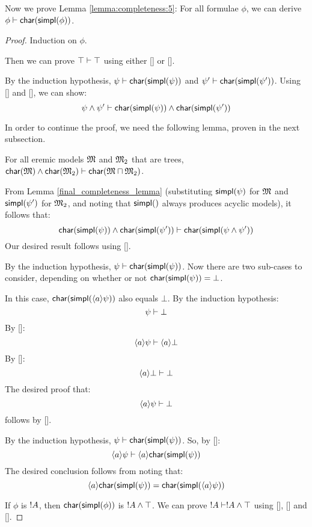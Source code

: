 Now we prove Lemma \ref{lemma:completeness:5}: 
For all formulae $\phi$, we can derive $\phi \vdash \mathsf{char}(\mathsf{simpl}(\phi))$.

\begin{proof}
Induction on $\phi$.


 Then we can prove $\top \vdash \top$ using
either [] or [].

 By the induction hypothesis,
$\psi \vdash \mathsf{char}(\mathsf{simpl}(\psi))$ and $\psi' \vdash
\mathsf{char}(\mathsf{simpl}(\psi'))$.  Using [] and [], we can show:
\[
\psi \land \psi' \vdash  \mathsf{char}(\mathsf{simpl}(\psi)) \land  \mathsf{char}(\mathsf{simpl}(\psi'))
\]


In order to continue the proof, we need the following lemma, proven
in the next subsection.

\begin{lemma}
\label{final_completeness_lemma}
For all eremic  models $\frak{M}$ and $\frak{M}_2$ that are trees, $ \mathsf{char}(\frak{M}) \land
\mathsf{char}(\frak{M}_2) \vdash \mathsf{char}(\frak{M} \sqcap \frak{M}_2)$.
\end{lemma}

\NI From Lemma \ref{final_completeness_lemma} (substituting $\mathsf{simpl}(\psi)$ for $\frak{M}$ and $\mathsf{simpl}(\psi')$ for $\frak{M}_2$, and noting that $\mathsf{simpl}()$ always produces acyclic models), it follows that:
\[
 \mathsf{char}(\mathsf{simpl}(\psi)) \land  \mathsf{char}(\mathsf{simpl}(\psi')) \vdash  \mathsf{char}(\mathsf{simpl}(\psi \land \psi'))
\]
Our desired result follows using [].

 By the induction
hypothesis, $\psi \vdash \mathsf{char}(\mathsf{simpl}(\psi))$.  Now there are two
sub-cases to consider, depending on whether or not $
\CHAR{\SIMPL{\psi}} = \bot$.  

\SUBCASE{$ \CHAR{\SIMPL{\psi}} = \bot$} In this case, $
\mathsf{char}(\mathsf{simpl}(\langle a \rangle \psi))$ also equals $\bot$.  By the
induction hypothesis:
\[
\psi \vdash \bot
\]
By []:
\[
\langle a \rangle \psi \vdash \langle a \rangle \bot
\]
By []:
\[
\langle a \rangle \bot \vdash \bot
\]
The desired proof that:
\[
\langle a \rangle \psi \vdash \bot
\]
follows by [].

\SUBCASE{$ \CHAR{\SIMPL{\psi}} \neq \bot$}
By the induction hypothesis, $\psi \vdash  \mathsf{char}(\mathsf{simpl}(\psi))$.
So, by []:
\[
\langle a \rangle \psi \vdash \langle a \rangle  \mathsf{char}(\mathsf{simpl}(\psi))
\]
The desired conclusion follows from noting that:
\[
 \langle a \rangle  \mathsf{char}(\mathsf{simpl}(\psi)) =  \mathsf{char}(\mathsf{simpl}(\langle a \rangle \psi))
 \]

  If $\phi$ is $! A$, then $
 \mathsf{char}(\mathsf{simpl}(\phi))$ is $! A \land \top$.  We can prove $! A
 \vdash ! A \land \top$ using [], [] and [].
\end{proof}

